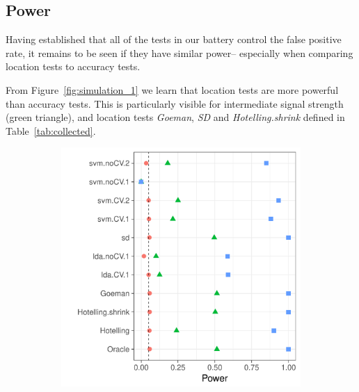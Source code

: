 \documentclass[12pt,a4paper]{article}
\begin{document}
\subsection{Power}
\label{sec:power}

Having established that all of the tests in our battery control the false positive rate, it remains to be seen if they have similar power-- especially when comparing location tests to accuracy tests. 

From Figure~\ref{fig:simulation_1} we learn that location tests are more powerful than accuracy tests.
This is particularly visible for intermediate signal strength (green triangle), and location tests \emph{Goeman}, \emph{SD} and \emph{Hotelling.shrink} defined in Table~\ref{tab:collected}.


\begin{figure}[h]
	\centering
	\caption{
		The power of the permutation test with various test statistics. 
		The power on the $x$ axis. 
		Effects are color and shape coded. 
		The various statistics on the $y$ axis. 
		Their details are given in Table~\ref{tab:collected}. 
		Effects vary over $\mu=(0,\dots,0)$ (red circle), $\mu=(0.25,\dots,0.25)$ (green triangle), and $\mu=(0.5,\dots,0.5)$ (blue square). 
		Simulation details in Section~\ref{sec:simulation_details}.
		Cross-validation was performed with balanced and unbalanced data folding. See sub-captions.}	
	\label{fig:simulation_1}
	\begin{subfigure}{.5\textwidth}
		\centering
		\includegraphics[width=1\linewidth]{"art/file3"}

\end{subfigure}
\end{figure}
\end{document}
